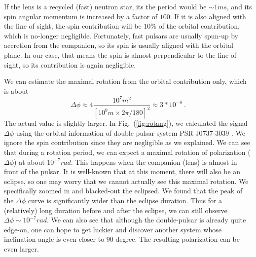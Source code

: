 \documentclass[aps,showpacs,twocolumn,floats,prd,superscriptaddress,nofootinbib]{revtex4}
\begin{document}
If the lens is a recycled (fast) neutron star, its the period would be $\sim 1ms$, and its spin angular momentum is increased by a factor of $100$.
If it is also aligned with the line of sight, the spin contribution will be $10\%$ of the orbital contribution, which is no-longer negligible.
Fortunately, fast pulsars are usually spun-up by accretion from the companion, so its spin is usually aligned with the orbital plane.
In our case, that means the spin is almost perpendicular to the line-of-sight, so its contribution is again negligible.

We can estimate the maximal rotation from the orbital contribution only, which is about\begin{equation}
\Delta\phi \approx 4 \frac{10^7 m^2}{\left[  10^9m\times  2\pi / 180 \right]^2}\approx 3*10^{-8}~.
\end{equation}
The actual value is slightly larger.
In Fig.~(\ref{fig:rotang}), we calculated the signal $\Delta \phi$ using the orbital information of double pulsar system PSR J0737-3039 \cite{KraSta97}. 
We ignore the spin contribution since they are negligible as we explained. 
We can see that during a rotation period, we can expect a maximal rotation of polarization ($\Delta\phi$) at about $10^{-7} rad$. 
This happens when the companion (lens) is almost in front of the pulsar.
It is well-known that at this moment, there will also be an eclipse, so one may worry that we cannot actually see this maximal rotation.
We specifically zoomed in and blacked-out the eclipsed.
We found that the peak of the $\Delta\phi$ curve is significantly wider than the eclipse duration.
Thus for a (relatively) long duration before and after the eclipse, we can still observe $\Delta\phi\sim10^{-7}rad$.
We can also see that although the double-pulsar is already quite edge-on, one can hope to get luckier and discover another system whose inclination angle is even closer to $90$ degree.
The resulting polarization can be even larger.







\end{document}
